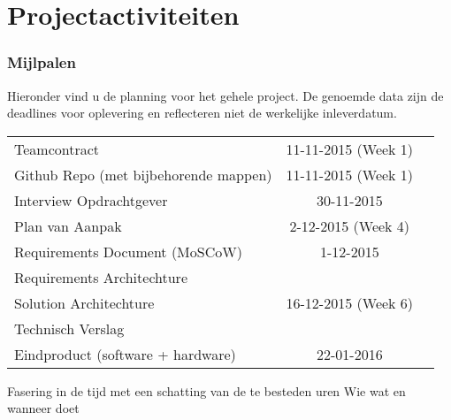 \chapter{Projectactiviteiten}

\subsection{Mijlpalen}
Hieronder vind u de planning voor het gehele project. De genoemde data zijn de deadlines voor oplevering en reflecteren niet de werkelijke inleverdatum.
\begin{table}[]
\centering
\begin{tabular}{ l c r }
  Teamcontract & 11-11-2015 (Week 1) \\
  Github Repo (met bijbehorende mappen) & 11-11-2015 (Week 1) \\
  Interview Opdrachtgever & 30-11-2015 \\
  Plan van Aanpak & 2-12-2015 (Week 4) \\
  Requirements Document (MoSCoW) & 1-12-2015 \\
  Requirements Architechture &  \\
  Solution Architechture & 16-12-2015 (Week 6) \\
  Technisch Verslag	&  \\
  Eindproduct (software + hardware)	& 22-01-2016 \\
\end{tabular}
\end{table}

Fasering in de tijd met een schatting van de te besteden uren
Wie wat en wanneer doet